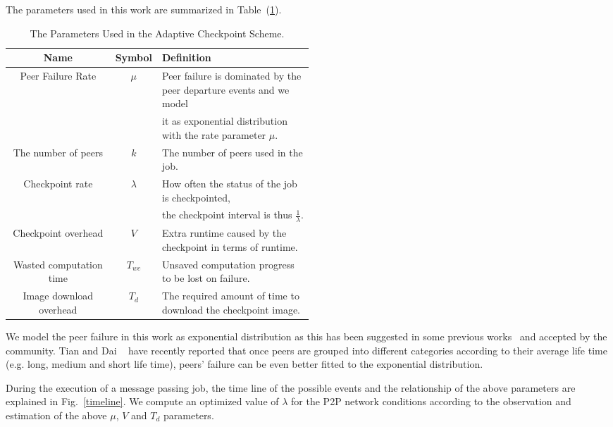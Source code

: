 \documentclass[times, 12pt, onecolumn]{article}
\newcommand{\reffig}[1]{Fig.~\ref{#1}}
\newcommand{\reftab}[1]{Table~(\ref{#1})}
\begin{document}
The parameters used in this work are summarized in \reftab{parameters}.
\begin{table*}[htbp]
\begin{center}
\caption{The Parameters Used in the Adaptive Checkpoint Scheme.}
\label{parameters}
\begin{tabular}{|c|c|p{0.5\linewidth}|}
        \hline
Name                 &  Symbol    & Definition \\
        \hline
Peer Failure Rate    &  $\mu$     & Peer failure is dominated by the peer departure events and we model \\
                     &            & it as exponential distribution~\cite{tianjing07, GhinitaT06} with the rate parameter $\mu$.  \\
	\hline
The number of peers  &  $k$       & The number of peers used in the job. \\
        \hline
Checkpoint rate      &  $\lambda$ & How often the status of the job is checkpointed, \\ 
                     &            & the checkpoint interval is thus $\frac{1}{\lambda}$.  \\
	\hline
Checkpoint overhead  &  $V$	  & Extra runtime caused by the checkpoint in terms of runtime.  \\ 
        \hline
Wasted computation time & $T_{wc}$ & Unsaved computation progress to be lost on failure. \\
        \hline
Image download overhead & $T_d$    & The required amount of time to download the checkpoint image.\\ 
	\hline
\end{tabular} 
\end{center}

\end{table*}

We model the peer failure in this work as exponential distribution as this has
been suggested in some previous works~\cite{tianjing07, GhinitaT06} and accepted
by the community. Tian and Dai ~\cite{tianjing07} have recently reported that once 
peers are grouped into different categories according to their average life time (e.g. 
long, medium and short life time), peers' failure can be even better fitted to the 
exponential distribution. 

During the execution of a message passing job, the time line of the possible
events and the relationship of the above parameters are explained in
\reffig{timeline}. We compute an optimized value of $\lambda$ for the P2P
network conditions according to the observation and estimation of the above
$\mu$, $V$ and $T_d$ parameters.
\end{document}
